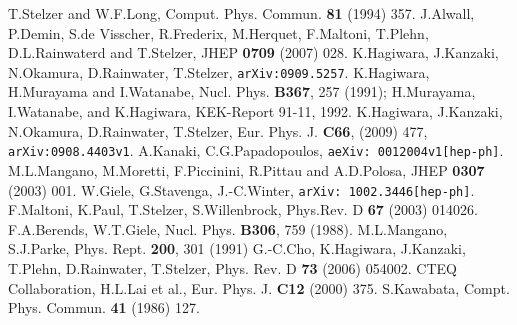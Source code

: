 \documentclass[a4paper,11pt]{article}
\begin{document}
\vspace{2em}
\begin{thebibliography}{15}
T.Stelzer and W.F.Long, Comput. Phys. Commun. {\bf 81}
	(1994) 357.
J.Alwall, P.Demin, S.de Visscher, R.Frederix, M.Herquet,
F.Maltoni, T.Plehn, D.L.Rainwaterd and T.Stelzer, JHEP {\bf 0709} (2007) 028.
K.Hagiwara, J.Kanzaki, N.Okamura, D.Rainwater, T.Stelzer, {\tt arXiv:0909.5257}.
K.Hagiwara, H.Murayama and I.Watanabe,
	Nucl. Phys. {\bf B367}, 257 (1991); H.Murayama, I.Watanabe, and K.Hagiwara, KEK-Report
	91-11, 1992.
K.Hagiwara, J.Kanzaki, N.Okamura, D.Rainwater,
	T.Stelzer, Eur. Phys. J. {\bf C66}, (2009) 477, {\tt
	arXiv:0908.4403v1}.
A.Kanaki, C.G.Papadopoulos, {\tt aeXiv: 0012004v1[hep-ph]}.
M.L.Mangano, M.Moretti, F.Piccinini, R.Pittau and A.D.Polosa, JHEP {\bf 0307} (2003) 001.
W.Giele, G.Stavenga, J.-C.Winter, {\tt arXiv: 1002.3446[hep-ph]}.
F.Maltoni, K.Paul, T.Stelzer, S.Willenbrock,
	Phys.Rev. D {\bf 67} (2003) 014026.
F.A.Berends, W.T.Giele, Nucl. Phys. {\bf B306}, 759 (1988).
M.L.Mangano, S.J.Parke, Phys. Rept. {\bf 200},
	301 (1991)
G.-C.Cho, K.Hagiwara, J.Kanzaki, T.Plehn,
	D.Rainwater, T.Stelzer, Phys. Rev. D {\bf 73} (2006) 054002.
CTEQ Collaboration, H.L.Lai et al., Eur. Phys. J. {\bf C12}
(2000) 375.
S.Kawabata, Compt. Phys. Commun. {\bf 41} (1986) 127.
\end{thebibliography}
\end{document}
